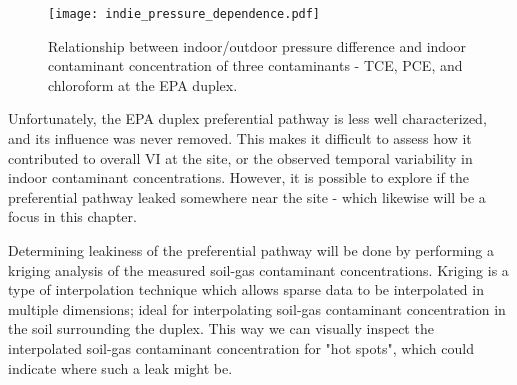 \begin{figure}[htb!]
  \centering
  \texttt{[image: indie\_pressure\_dependence.pdf]}
  \caption{Relationship between indoor/outdoor pressure difference and indoor contaminant concentration of three contaminants - TCE, PCE, and chloroform at the EPA duplex.}
  \label{fig:indie_pressure_dependence}
\end{figure}

Unfortunately, the EPA duplex preferential pathway is less well characterized, and its influence was never removed.
This makes it difficult to assess how it contributed to overall VI at the site, or the observed temporal variability in indoor contaminant concentrations.
However, it is possible to explore if the preferential pathway leaked somewhere near the site - which likewise will be a focus in this chapter.\par

Determining leakiness of the preferential pathway will be done by performing a kriging analysis of the measured soil-gas contaminant concentrations.
Kriging is a type of interpolation technique which allows sparse data to be interpolated in multiple dimensions; ideal for interpolating soil-gas contaminant concentration in the soil surrounding the duplex.
This way we can visually inspect the interpolated soil-gas contaminant concentration for "hot spots", which could indicate where such a leak might be.\par
